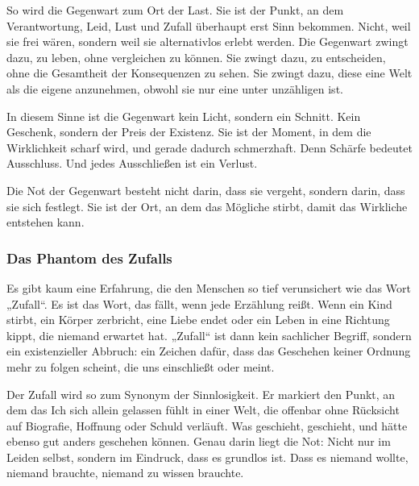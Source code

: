 \documentclass[
  ngerman,
]{article}
\begin{document}
So wird die Gegenwart zum Ort der Last. Sie ist der Punkt, an dem
Verantwortung, Leid, Lust und Zufall überhaupt erst Sinn bekommen.
Nicht, weil sie frei wären, sondern weil sie alternativlos erlebt
werden. Die Gegenwart zwingt dazu, zu leben, ohne vergleichen zu können.
Sie zwingt dazu, zu entscheiden, ohne die Gesamtheit der Konsequenzen zu
sehen. Sie zwingt dazu, diese eine Welt als die eigene anzunehmen,
obwohl sie nur eine unter unzähligen ist.

In diesem Sinne ist die Gegenwart kein Licht, sondern ein Schnitt. Kein
Geschenk, sondern der Preis der Existenz. Sie ist der Moment, in dem die
Wirklichkeit scharf wird, und gerade dadurch schmerzhaft. Denn Schärfe
bedeutet Ausschluss. Und jedes Ausschließen ist ein Verlust.

Die Not der Gegenwart besteht nicht darin, dass sie vergeht, sondern
darin, dass sie sich festlegt. Sie ist der Ort, an dem das Mögliche
stirbt, damit das Wirkliche entstehen kann.

\subsubsection{\texorpdfstring{\hfill\break
}{ }}\label{section}

\subsubsection{\texorpdfstring{\textbf{Das Phantom des
Zufalls}}{Das Phantom des Zufalls}}\label{das-phantom-des-zufalls}

Es gibt kaum eine Erfahrung, die den Menschen so tief verunsichert wie
das Wort „Zufall``. Es ist das Wort, das fällt, wenn jede Erzählung
reißt. Wenn ein Kind stirbt, ein Körper zerbricht, eine Liebe endet oder
ein Leben in eine Richtung kippt, die niemand erwartet hat. „Zufall``
ist dann kein sachlicher Begriff, sondern ein existenzieller Abbruch:
ein Zeichen dafür, dass das Geschehen keiner Ordnung mehr zu folgen
scheint, die uns einschließt oder meint.

Der Zufall wird so zum Synonym der Sinnlosigkeit. Er markiert den Punkt,
an dem das Ich sich allein gelassen fühlt in einer Welt, die offenbar
ohne Rücksicht auf Biografie, Hoffnung oder Schuld verläuft. Was
geschieht, geschieht, und hätte ebenso gut anders geschehen können.
Genau darin liegt die Not: Nicht nur im Leiden selbst, sondern im
Eindruck, dass es grundlos ist. Dass es niemand wollte, niemand
brauchte, niemand zu wissen brauchte.
\end{document}
